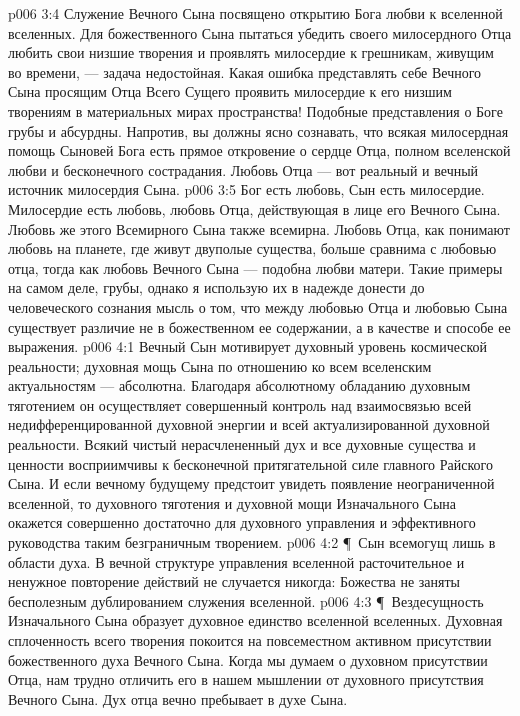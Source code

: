\vs p006 3:4 Служение Вечного Сына посвящено открытию Бога любви к вселенной вселенных. Для божественного Сына пытаться убедить своего милосердного Отца любить свои низшие творения и проявлять милосердие к грешникам, живущим во времени, --- задача недостойная. Какая ошибка представлять себе Вечного Сына просящим Отца Всего Сущего проявить милосердие к его низшим творениям в материальных мирах пространства! Подобные представления о Боге грубы и абсурдны. Напротив, вы должны ясно сознавать, что всякая милосердная помощь Сыновей Бога есть прямое откровение о сердце Отца, полном вселенской любви и бесконечного сострадания. Любовь Отца --- вот реальный и вечный источник милосердия Сына.
\vs p006 3:5 Бог есть любовь, Сын есть милосердие. Милосердие есть любовь, любовь Отца, действующая в лице его Вечного Сына. Любовь же этого Всемирного Сына также всемирна. Любовь Отца, как понимают любовь на планете, где живут двуполые существа, больше сравнима с любовью отца, тогда как любовь Вечного Сына --- подобна любви матери. Такие примеры на самом деле, грубы, однако я использую их в надежде донести до человеческого сознания мысль о том, что между любовью Отца и любовью Сына существует различие не в божественном ее содержании, а в качестве и способе ее выражения.
\vs p006 4:1 Вечный Сын мотивирует духовный уровень космической реальности; духовная мощь Сына по отношению ко всем вселенским актуальностям --- абсолютна. Благодаря абсолютному обладанию духовным тяготением он осуществляет совершенный контроль над взаимосвязью всей недифференцированной духовной энергии и всей актуализированной духовной реальности. Всякий чистый нерасчлененный дух и все духовные существа и ценности восприимчивы к бесконечной притягательной силе главного Райского Сына. И если вечному будущему предстоит увидеть появление неограниченной вселенной, то духовного тяготения и духовной мощи Изначального Сына окажется совершенно достаточно для духовного управления и эффективного руководства таким безграничным творением.
\vs p006 4:2 \P\ Сын всемогущ лишь в области духа. В вечной структуре управления вселенной расточительное и ненужное повторение действий не случается никогда: Божества не заняты бесполезным дублированием служения вселенной.
\vs p006 4:3 \P\ Вездесущность Изначального Сына образует духовное единство вселенной вселенных. Духовная сплоченность всего творения покоится на повсеместном активном присутствии божественного духа Вечного Сына. Когда мы думаем о духовном присутствии Отца, нам трудно отличить его в нашем мышлении от духовного присутствия Вечного Сына. Дух отца вечно пребывает в духе Сына.
